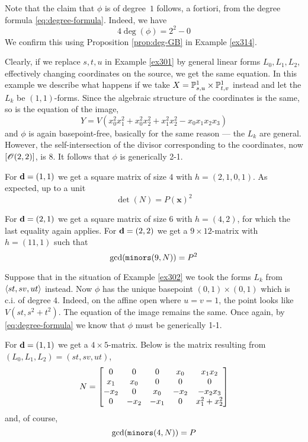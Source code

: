 \documentclass[fleqn,reqno]{amsart}
\begin{document}
\begin{example}[$\mt{ex301}$]
Note that the claim that $\phi$ is of degree~$1$ follows, a fortiori, from the degree formula
\eqref{eq:degree-formula}. Indeed, we have
\[
	4\deg(\phi)=2^2-0
\]
We confirm this using Proposition \ref{prop:deg-GB} in Example \ref{ex314}.
\end{example}

\begin{example}[$\mt{ex302}$]
\label{ex302}
Clearly, if we replace $s,t,u$ in Example \ref{ex301} by general linear forms $L_0,L_1,L_2$,
effectively changing coordinates on the source, we get the same equation.
In this example we describe what happens if we take $X=\mathbb{P}^1_{s,u}\times\mathbb{P}^1_{t,v}$ instead
and let the $L_k$ be $(1,1)$-forms.
Since the algebraic structure of the coordinates is the same, so is the equation of the image,
\[
	Y=V({x}_{0}^{2} {x}_{1}^{2}+{x}_{0}^{2} {x}_{2}^{2}+{x}_{1}^{2}
	{x}_{2}^{2}-{x}_{0} {x}_{1} {x}_{2} {x}_{3})
\]
and $\phi$ is again basepoint-free, basically for the same reason ---
the $L_k$ are general.
However, the self-intersection of the divisor corresponding to the coordinates,
now $[\mathscr{O}(2,2)]$, is $8$.
It follows that $\phi$ is generically 2-1.

For $\mathbf d=(1,1)$ we get a square matrix of size $4$ with $h=(2,1,0,1)$.
As expected, up to a unit
\[
	\det(N)=P(\mathbf x)^2
\]

For $\mathbf d=(2,1)$ we get a square matrix of size $6$ with $h=(4,2)$, for which the
last equality again applies.
For $\mathbf d=(2,2)$ we get a $9\times12$-matrix with $h=(11,1)$ such that
\[
	\gcd(\mathop{\tt minors}(9,N))=P^2
\]
\end{example}

\begin{example}[$\mt{ex303}$]
\label{ex303}
Suppose that in the situation of Example \ref{ex302} we took the forms $L_k$ from
$\langle st,sv,ut\rangle$ instead.
Now $\phi$ has the unique basepoint $(0,1)\times(0,1)$ which is c.i. of degree $4$.
Indeed, on the affine open where $u=v=1$, the point looks like $V(st,s^2+t^2)$.
The equation of the image remains the same.
Once again, by \eqref{eq:degree-formula} we know that $\phi$ must be generically 1-1.

For $\mathbf d=(1,1)$ we get a $4\times5$-matrix.
Below is the matrix resulting from $(L_0,L_1,L_2)=(st,sv,ut)$,
\[
	N=
	\bgroup\begin{bmatrix}0&
      0&
      0&
      {x}_{0}&
      {x}_{1} {x}_{2}\\
      {x}_{1}&
      {x}_{0}&
      0&
      0&
      0\\
      {-{x}_{2}}&
      0&
      {x}_{0}&
      {-{x}_{2}}&
      {-{x}_{2} {x}_{3}}\\
      0&
      {-{x}_{2}}&
      {-{x}_{1}}&
      0&
      {x}_{1}^{2}+{x}_{2}^{2}\\
      \end{bmatrix}\egroup
\]
and, of course,
\[
	\gcd(\mathop{\tt minors}(4,N))=P
\]
\end{example}
\end{document}
